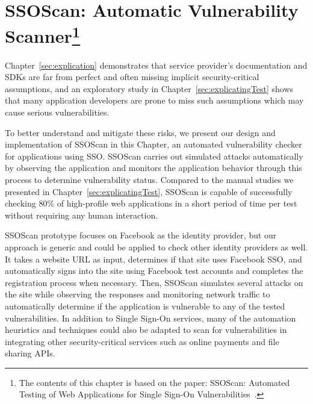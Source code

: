 \chapter[SSOScan: Automatic Vulnerability Scanner]{SSOScan: Automatic Vulnerability Scanner\footnote{The contents of this chapter is based on the paper: SSOScan: Automated Testing of Web Applications for Single Sign-On Vulnerabilities~\cite{SSOScan}.}}
\label{sec:ssoscan}

Chapter~\ref{sec:explication} demonstrates that service provider's documentation and SDKs are far from perfect and often missing implicit security-critical assumptions, and an exploratory study in Chapter~\ref{sec:explicatingTest} shows that many application developers are prone to miss such assumptions which may cause serious vulnerabilities.  

To better understand and mitigate these risks, we present our design and implementation of SSOScan in this Chapter, an automated vulnerability checker for applications using SSO.  SSOScan carries out simulated attacks automatically by observing the application and monitors the application behavior through this process to determine vulnerability status.  Compared to the manual studies we presented in Chapter~\ref{sec:explicatingTest}, SSOScan is capable of successfully checking 80\% of high-profile web applications in a short period of time per test without requiring any human interaction.  

SSOScan prototype focuses on Facebook as the identity provider, but our approach is generic and could be applied to check other identity providers as well.  It takes a website URL as input, determines if that site uses Facebook SSO, and automatically signs into the site using Facebook test accounts and completes the registration process when necessary.  Then, SSOScan simulates several attacks on the site while observing the responses and monitoring network traffic to automatically determine if the application is vulnerable to any of the tested vulnerabilities.  In addition to Single Sign-On services, many of the automation heuristics and techniques could also be adapted to scan for vulnerabilities in integrating other security-critical services such as online payments and file sharing APIs.

